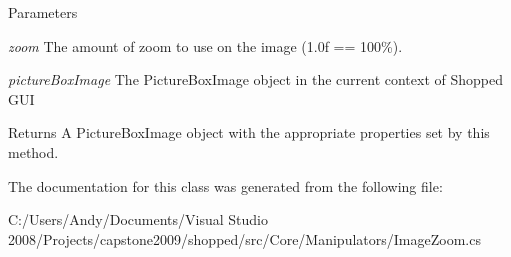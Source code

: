 \begin{DoxyParams}{Parameters}
\item[{\em zoom}]The amount of zoom to use on the image (1.0f == 100\%). \item[{\em pictureBoxImage}]The PictureBoxImage object in the current context of Shopped GUI \end{DoxyParams}
\begin{DoxyReturn}{Returns}
A PictureBoxImage object with the appropriate properties set by this method. 
\end{DoxyReturn}


The documentation for this class was generated from the following file:\begin{DoxyCompactItemize}
\item 
C:/Users/Andy/Documents/Visual Studio 2008/Projects/capstone2009/shopped/src/Core/Manipulators/ImageZoom.cs\end{DoxyCompactItemize}
